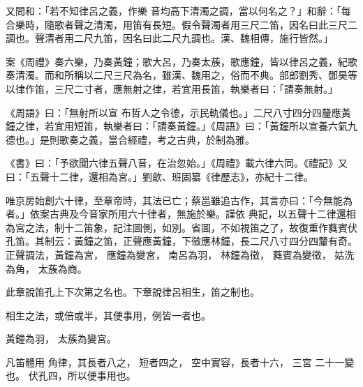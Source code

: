 \begin{pinyinscope}
 又問和：「若不知律呂之義，作樂
 音均高下清濁之調，當以何名之？」和辭：「每合樂時，隨歌者聲之清濁，用笛有長短。假令聲濁者用三尺二笛，因名曰此三尺二調也。聲清者用二尺九笛，因名曰此二尺九調也。漢、魏相傳，施行皆然。」



 案《周禮》奏六樂，乃奏黃鐘；歌大呂，乃奏太蔟，歌應鐘，皆以律呂之義，紀歌奏清濁。而和所稱以二尺三尺為名，雖漢、魏用之，俗而不典。部郎劉秀、鄧昊等以律作笛，三尺二寸者，應無射之律，若宜用長笛，執樂者曰：「請奏無射。」



 《周語》曰：「無射所以宣
 布哲人之令德，示民軌儀也。」二尺八寸四分四釐應黃鐘之律，若宜用短笛，執樂者曰：「請奏黃鐘。」《周語》曰：「黃鐘所以宣養六氣九德也。」是則歌奏之義，當合經禮，考之古典，於制為雅。



 《書》曰：「予欲聞六律五聲八音，在治忽始。」《周禮》載六律六同。《禮記》又曰：「五聲十二律，還相為宮。」劉歆、班固纂《律歷志》，亦紀十二律。


唯京房始創六十律，至章帝時，其法已亡；蔡邕雖追古作，其言亦曰：「今無能為者。」依案古典及今音家所用六十律者，無施於樂。謹依
 典記，以五聲十二律還相為宮之法，制十二笛象，記注圖側，如別。省圖，不如視笛之了，故復重作蕤賓伏孔笛。其制云：黃鐘之笛，正聲應黃鐘，下徵應林鐘，長二尺八寸四分四釐有奇。
 正聲調法，黃鐘為宮，
 應鐘為變宮，
 南呂為羽，
 林鐘為徵，
 蕤賓為變徵，
 姑洗為角，
 太蔟為商。



 此章說笛孔上下次第之名也。下章說律呂相生，笛之制也。





 相生之法，或倍或半，其便事用，例皆一者也。


黃鐘為羽，
 太蔟為變宮。


凡笛體用
 角律，其長者八之，
 短者四之，
 空中實容，長者十六，
 三宮
 二十一變也。
 伏孔四，所以便事用也。



\end{pinyinscope}
